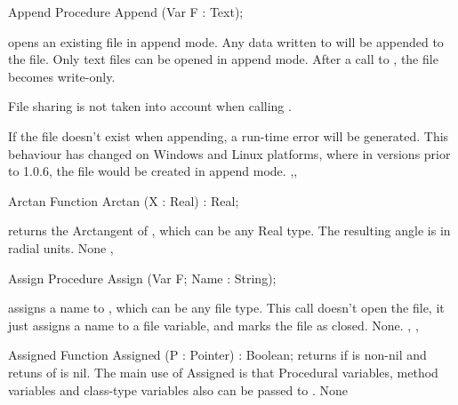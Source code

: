 
\begin{procedure}{Append}
\Declaration
Procedure Append (Var F : Text);

\Description
{} opens an existing file in append mode. Any data written to
 will be appended to the file. Only text files can be opened in
append mode. After a call to , the file  becomes
write-only.

File sharing is not taken into account when calling .

\Errors
If the file doesn't exist when appending, a run-time error will be generated.
This behaviour has changed on Windows and Linux platforms, where in versions
prior to 1.0.6, the file would be created in append mode.
\SeeAlso
{},, 
\end{procedure}


\begin{function}{Arctan}
\Declaration
Function Arctan (X : Real) : Real;

\Description
{} returns the Arctangent of , which can be any Real type.
The resulting angle is in radial units.
\Errors
None
\SeeAlso
{}, 
\end{function}


\begin{procedure}{Assign}
\Declaration
Procedure Assign (Var F; Name : String);

\Description
{} assigns a name to , which can be any file type.
This call doesn't open the file, it just assigns a name to a file variable,
and marks the file as closed.
\Errors
None.
\SeeAlso
{}, , 
\end{procedure}


\begin{function}{Assigned}
\Declaration
Function Assigned (P : Pointer) : Boolean;
\Description
{} returns  if  is non-nil
and retuns  of  is nil.
The main use of Assigned is that Procedural variables, method variables and
class-type variables also can be passed to .
\Errors
None
\SeeAlso
{}
\end{function}


